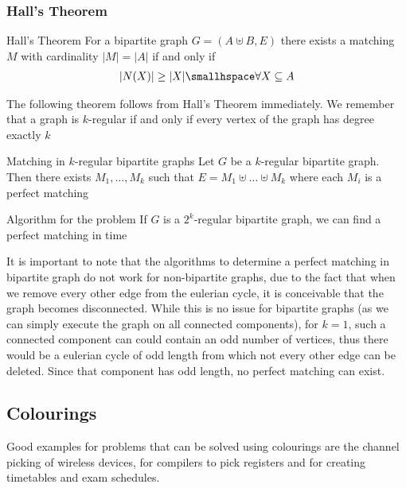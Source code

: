 \subsubsection{Hall's Theorem}
\begin{theorem}[]{Hall's Theorem}
    For a bipartite graph $G = (A \uplus B, E)$ there exists a matching $M$ with cardinality $|M| = |A|$ if and only if
    \begin{align*}
        |N(X)| \geq |X| \smallhspace \forall X \subseteq{A}
    \end{align*}
\end{theorem}
The following theorem follows from Hall's Theorem immediately. We remember that a graph is $k$-regular if and only if every vertex of the graph has degree exactly $k$

\begin{theorem}[]{Matching in $k$-regular bipartite graphs}
    Let $G$ be a $k$-regular bipartite graph. Then there exists $M_1, \ldots, M_k$ such that $E = M_1 \uplus \ldots \uplus M_k$ where each $M_i$ is a perfect matching
\end{theorem}

\begin{theorem}[]{Algorithm for the problem}
    If $G$ is a $2^k$-regular bipartite graph, we can find a perfect matching in time 
\end{theorem}
It is important to note that the algorithms to determine a perfect matching in bipartite graph do not work for non-bipartite graphs, due to the fact that when we remove every other edge from the eulerian cycle, it is conceivable that the graph becomes disconnected. While this is no issue for bipartite graphs (as we can simply execute the graph on all connected components), for $k = 1$, such a connected component can could contain an odd number of vertices, thus there would be a eulerian cycle of odd length from which not every other edge can be deleted. Since that component has odd length, no perfect matching can exist.



\newpage
\subsection{Colourings}
Good examples for problems that can be solved using colourings are the channel picking of wireless devices, for compilers to pick registers and for creating timetables and exam schedules.

